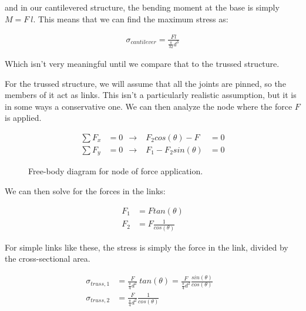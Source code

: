 \documentclass[10pt,letterpaper]{book}
\begin{document}
and in our cantilevered structure, the bending moment at the base is simply $M = F \ l$. This means that we can find the maximum stress as:

\begin{align}
	\sigma_{cantilever} = \frac{F l}{\frac{\pi}{32}d^3}
\end{align}

Which isn't very meaningful until we compare that to the trussed structure.

For the trussed structure, we will assume that all the joints are pinned, so the members of it act as links. This isn't a particularly realistic assumption, but it is in some ways a conservative one. We can then analyze the node where the force $F$ is applied.

\begin{figure}[H]
\begin{subfigure}[b]{.4\linewidth}
\end{subfigure}\begin{subfigure}[b]{.5\linewidth}
\begin{align}
	\sum F_x &= 0 \ \ \rightarrow & F_2 cos(\theta) - F &= 0 \\
	\sum F_y &= 0 \ \ \rightarrow & F_1 - F_2 sin(\theta) &= 0
\end{align}
\end{subfigure}
\caption{Free-body diagram for node of force application.}
\end{figure}

We can then solve for the forces in the links:

\begin{align}
	F_1 &= F tan(\theta) \\
	F_2 &= F \frac{1}{cos(\theta)}
\end{align}

For simple links like these, the stress is simply the force in the link, divided by the cross-sectional area.

\begin{align}
	\sigma_{truss, 1} &= \frac{F}{\frac{\pi}{4} d^2} \ tan (\theta) = \frac{F}{\frac{\pi}{4} d^2} \frac{sin(\theta)}{cos(\theta)} \\
	\sigma_{truss, 2} &= \frac{F}{\frac{\pi}{4} d^2} \frac{1}{cos(\theta)} & 
\end{align}
\end{document}
